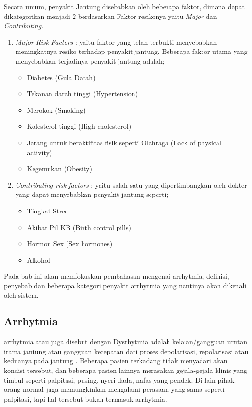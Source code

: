 Secara umum, penyakit Jantung disebabkan oleh beberapa faktor, dimana dapat 
dikategorikan menjadi 2 berdasarkan Faktor resikonya yaitu  \textit{Major} dan
\textit{Contributing}.
\begin{enumerate}
    \item \textit{Major Risk Factors} : yaitu faktor yang telah terbukti 
    menyebabkan meningkatnya resiko terhadap penyakit jantung.  Beberapa faktor
    utama yang menyebabkan terjadinya penyakit jantung adalah;
	\begin{itemize}
	    \setlength{\itemsep}{1pt}
  		\setlength{\parskip}{0pt}
  		\setlength{\parsep}{0pt}
	    \item Diabetes (Gula Darah)
	    \item Tekanan darah tinggi (Hypertension)
	    \item Merokok (Smoking)
	    \item Kolesterol tinggi (High cholesterol)
	    \item Jarang untuk beraktifitas fisik seperti Olahraga  (Lack of physical
	    activity)
	    \item Kegemukan (Obesity)
	\end{itemize}

	\item \textit{Contributing risk factors} ; yaitu salah satu  yang
	dipertimbangkan oleh dokter yang dapat menyebabkan penyakit jantung seperti;
	\begin{itemize}
	  	\setlength{\itemsep}{1pt}
		\setlength{\parskip}{0pt}
  		\setlength{\parsep}{0pt}
	    \item Tingkat Stres
	    \item Akibat Pil KB (Birth control pills)
	    \item Hormon Sex (Sex hormones)
	    \item Alkohol
	\end{itemize}
\end{enumerate}

Pada bab ini \saya akan memfokuskan pembahasan
mengenai arrhytmia, definisi, penyebab dan beberapa kategori penyakit arrhytmia
yang nantinya akan dikenali oleh sistem.

\subsection{Arrhytmia}
\label{ssec:arrhytmia}
\Gls{arrhytmia} atau juga disebut dengan Dysrhytmia adalah kelaian/gangguan
urutan irama jantung atau gangguan kecepatan dari proses depolarisasi, repolarisasi
atau keduanya pada jantung \cite{karim.1}. Beberapa pasien terkadang tidak
menyadari akan kondisi tersebut, dan beberapa pasien lainnya merasakan
gejala-gejala klinis yang timbul seperti \gls{palpitasi}, pusing, nyeri dada,
nafas yang pendek. Di lain pihak, orang normal juga memungkinkan mengalami perasaan
yang sama seperti \gls{palpitasi}, tapi hal tersebut bukan termasuk arrhytmia.

